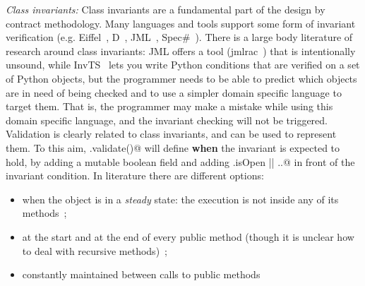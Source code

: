 \noindent\textit{Class invariants:}
Class invariants are a fundamental part of the design by contract methodology. 
Many languages and tools support some form of invariant verification (e.g. Eiffel~\cite{Meyer:1992:EL:129093}, D~\cite{Alexandrescu:2010:DPL:1875434}, JML~\cite{Burdy2005}, Spec\#~\cite{Barnett:2004:SPS:2131546.2131549}).
There is a large body literature of research around class invariants:
JML offers a tool (jmlrac~\cite{Burdy2005}) that is intentionally unsound,
while InvTS~\cite{gorbovitski08efficient} lets you write Python conditions
 that are verified on a set of Python objects, but the programmer needs to be able
 to predict which objects are in need of being checked and to use a simpler domain
 specific language to target them. That is, the programmer may make a mistake
while using this domain specific language, and the invariant checking
will not be triggered.
Validation is clearly related to class invariants, and can be used to represent them.
To this aim, \Q@.validate()@ will define \textbf{when} the invariant is expected to hold,
by adding a mutable boolean \Q@isOpen@ field and adding \Q@this.isOpen || ..@
in front of the invariant condition.
In literature there are different options:
\begin{itemize}
\item  when the object is in a \textit{steady} state:
 the execution is not inside any of its methods~\cite{Gopinathan:2008:RMO:1483018.1483028};
\item
at the start and at the end of every public method
(though it is unclear how to deal with recursive methods)~\cite{Burdy2005};
\item
constantly maintained between calls to public methods~\cite{DATEplusURL}
\end{itemize}


\newcommand\sepItems{\saveSpace\saveSpace\saveSpace\\*${}_{}$\\*$\bullet\,$}

